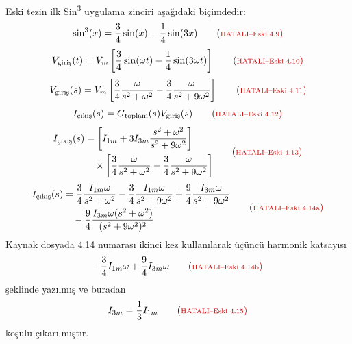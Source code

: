 Eski tezin ilk Sin\textsuperscript{3} uygulama zinciri aşağıdaki biçimdedir:
\begin{equation*}
  \sin^3(x)=\frac{3}{4}\sin(x)-\frac{1}{4}\sin(3x)
  \hatalieskitag{4.9}
\end{equation*}
\begin{equation*}
  V_{\text{giriş}}(t)
  =V_m\left[\frac{3}{4}\sin(\omega t)-\frac{1}{4}\sin(3\omega t)\right]
  \hatalieskitag{4.10}
\end{equation*}
\begin{equation*}
  V_{\text{giriş}}(s)
  =V_m\left[\frac{3}{4}\frac{\omega}{s^2+\omega^2}
  -\frac{3}{4}\frac{\omega}{s^2+9\omega^2}\right]
  \hatalieskitag{4.11}
\end{equation*}
\begin{equation*}
  I_{\text{çıkış}}(s)
  =G_{\mathrm{toplam}}(s)V_{\text{giriş}}(s)
  \hatalieskitag{4.12}
\end{equation*}
\begin{equation*}
  \begin{aligned}
  I_{\text{çıkış}}(s)
  &=\left[I_{1m}+3I_{3m}\frac{s^2+\omega^2}{s^2+9\omega^2}\right]\\
  &\quad\times\left[\frac{3}{4}\frac{\omega}{s^2+\omega^2}
  -\frac{3}{4}\frac{\omega}{s^2+9\omega^2}\right]
  \end{aligned}
  \hatalieskitag{4.13}
\end{equation*}
\begin{equation*}
  \begin{aligned}
  I_{\text{çıkış}}(s)
  &=\frac{3}{4}\frac{I_{1m}\omega}{s^2+\omega^2}
   -\frac{3}{4}\frac{I_{1m}\omega}{s^2+9\omega^2}
   +\frac{9}{4}\frac{I_{3m}\omega}{s^2+9\omega^2}\\
  &\quad-\frac{9}{4}
   \frac{I_{3m}\omega(s^2+\omega^2)}{(s^2+9\omega^2)^2}
  \end{aligned}
  \hatalieskitag{4.14a}
\end{equation*}
Kaynak dosyada 4.14 numarası ikinci kez kullanılarak üçüncü harmonik katsayısı
\begin{equation*}
  -\frac{3}{4}I_{1m}\omega+\frac{9}{4}I_{3m}\omega
  \hatalieskitag{4.14b}
\end{equation*}
şeklinde yazılmış ve buradan
\begin{equation*}
  I_{3m}=\frac{1}{3}I_{1m}
  \hatalieskitag{4.15}
\end{equation*}
koşulu çıkarılmıştır.

